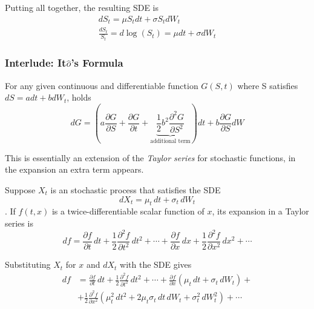 \documentclass[12pt,a4paper]{article}
\begin{document}
Putting all together, the resulting SDE is
\begin{equation}
\begin{gathered}
dS_t = \mu S_t dt + \sigma S_t dW_t \\
\frac{dS_t}{S_t} = d\log(S_t) = \mu dt + \sigma dW_t
\end{gathered}
\label{eq:log_normal_sde}
\end{equation}

\subsubsection{Interlude: It$\hat{o}$'s Formula}
For any given continuous and differentiable function $G(S,t)$ where S satisfies $dS=adt + bdW_t$, holds
\begin{equation}
dG = \left(a\frac{\partial G}{\partial S} + \frac{\partial G}{\partial t} + \underbrace{\frac{1}{2}b^2\frac{\partial^2 G}{\partial S^2}}_{\text{additional term}}\right)dt + b\frac{\partial G}{\partial S} dW
\label{eq:itos_lemma}
\end{equation}
			
This is essentially an extension of the \emph{Taylor series} for stochastic functions, in the expansion an extra term appears.	

Suppose $X_t$ is an stochastic process that satisfies the SDE
\begin{equation*}	
dX_{t}=\mu _{t}\,dt+\sigma _{t}\,dW_{t}
\end{equation*}.
If $f(t,x)$ is a twice-differentiable scalar function of $x$, its expansion in a Taylor series is
\begin{equation*}
df={\frac {\partial f}{\partial t}}\,dt+{\frac {1}{2}}{\frac {\partial ^{2}f}{\partial t^{2}}}\,dt^{2}+\cdots +{\frac {\partial f}{\partial x}}\,dx+{\frac {1}{2}}{\frac {\partial ^{2}f}{\partial x^{2}}}\,dx^{2}+\cdots
\end{equation*}

Substituting $X_t$ for $x$ and $dX_t$ with the SDE gives
\begin{equation*}
\begin{aligned}
df&={\frac {\partial f}{\partial t}}\,dt+{\frac {1}{2}}{\frac {\partial ^{2}f}{\partial t^{2}}}\,dt^{2}+\cdots +{\frac {\partial f}{\partial x}}(\mu _{t}\,dt+\sigma _{t}\,dW_{t})+\\
&+{\frac {1}{2}}{\frac {\partial ^{2}f}{\partial x^{2}}}\left(\mu _{t}^{2}\,dt^{2}+2\mu _{t}\sigma _{t}\,dt\,dW_{t}+\sigma _{t}^{2}\,dW_{t}^{2}\right)+\cdots
\end{aligned}
\end{equation*}
\end{document}
